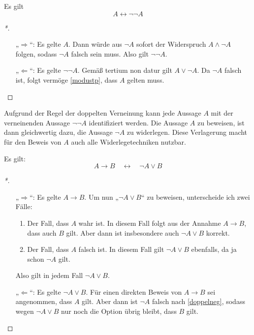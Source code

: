    
\begin{satz} \label{doppelneg}
    Es gilt
    \[ A\leftrightarrow \neg \neg A \]
\end{satz}
\begin{proof}[*]
    \begin{itemize}
        \item[„$\Rightarrow$“:] Es gelte $A$. Dann würde aus $\neg A$ sofort der Widerspruch $A\land \neg A$ folgen, sodass $\neg A$ falsch sein muss. Also gilt $\neg\neg A$.
        \item[„$\Leftarrow$“:] Es gelte $\neg \neg A$. Gemäß tertium non datur gilt $A\lor \neg A$. Da $\neg A$ falsch ist, folgt vermöge \cref{modustp}, dass $A$ gelten muss. \qedhere
    \end{itemize}
\end{proof}


\begin{bem}
    Aufgrund der Regel der doppelten Verneinung kann jede Aussage $A$ mit der verneinenden Aussage $\neg\neg A$ identifiziert werden. Die Aussage $A$ zu beweisen, ist dann gleichwertig dazu, die Aussage $\neg A$ zu widerlegen. Diese Verlagerung macht für den Beweis von $A$ auch alle Widerlegetechniken nutzbar.
\end{bem}


\begin{satz} \label{implikationchar}
    Es gilt:
        \[ A\to B\quad \leftrightarrow\quad \neg A\lor B \]
\end{satz}
\begin{proof}[*]
    \begin{enumerate}
        \item[„$\Rightarrow$“:] Es gelte $A\to B$. Um nun „$\neg A\lor B$“ zu beweisen, unterscheide ich zwei Fälle:
        \begin{enumerate}[1)]
            \item Der Fall, dass $A$ wahr ist. In diesem Fall folgt aus der Annahme $A\to B$, dass auch $B$ gilt. Aber dann ist insbesondere auch $\neg A\lor B$ korrekt.
            \item Der Fall, dass $A$ falsch ist. In diesem Fall gilt $\neg A\lor B$ ebenfalls, da ja schon $\neg A$ gilt.
        \end{enumerate}
        Also gilt in jedem Fall $\neg A\lor B$.
        \item[„$\Leftarrow$“:] Es gelte $\neg A\lor B$. Für einen direkten Beweis von $A\to B$ sei angenommen, dass $A$ gilt. Aber dann ist $\neg A$ falsch nach \cref{doppelneg}, sodass wegen $\neg A\lor B$ nur noch die Option übrig bleibt, dass $B$ gilt. \qedhere
    \end{enumerate}
\end{proof}


